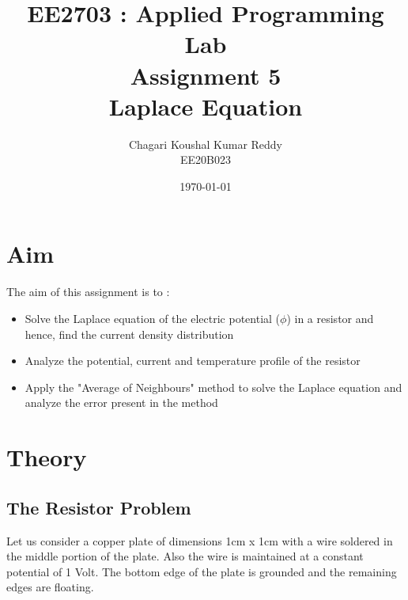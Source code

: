 \documentclass[12pt, a4paper]{article}
\title{\textbf{EE2703 : Applied Programming Lab \\ Assignment 5 \\ Laplace Equation}}
\author{Chagari Koushal Kumar Reddy \\ EE20B023} %
\date{\today} %
\begin{document}
		

\maketitle %
\clearpage

\tableofcontents
\clearpage

\section{Aim}
The aim of this assignment is to :
\begin{itemize}
    \item Solve the Laplace equation of the electric potential ($\phi$) in a resistor and hence, find the current density distribution
    \item Analyze the potential, current and temperature profile of the resistor
    \item Apply the "Average of Neighbours" method to solve the Laplace equation and analyze the error present in the method
\end{itemize}

\section{Theory}
\subsection{The Resistor Problem}
Let us consider a copper plate of dimensions 1cm x 1cm with a wire soldered in the middle portion of the plate. Also the wire is maintained at a constant potential of 1 Volt.
The bottom edge of the plate is grounded and the remaining edges are floating.
\end{document}
